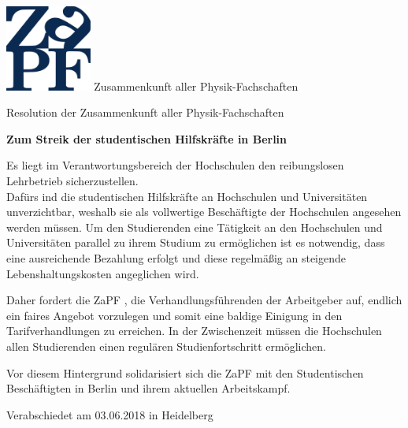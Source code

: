\documentclass[DIV=calc]{scrartcl}
\begin{document}
    \hspace{0.87\textwidth}
    \begin{minipage}{120pt}
        \vspace{-1.8cm}
        \includegraphics[width=80pt]{logo.pdf}
        \centering
        \small Zusammenkunft aller Physik-Fachschaften
    \end{minipage}
    \begin{center}
        \huge{Resolution der Zusammenkunft aller Physik-Fachschaften}\vspace{.25\baselineskip}\\
        \normalsize
    \end{center}
    \vspace{1cm} 
   \textbf{\large{Zum Streik der studentischen Hilfskräfte in Berlin}}
    

Es liegt im Verantwortungsbereich der Hochschulen den	reibungslosen
Lehrbetrieb	sicherzustellen.\\
Dafürs ind die studentischen Hilfskräfte an	Hochschulen	und
Universitäten	unverzichtbar, weshalb sie als vollwertige Beschäftigte	der	Hochschulen	angesehen
werden	müssen.	Um	den	Studierenden	eine	Tätigkeit	an	den	Hochschulen	und	Universitäten	parallel
zu	ihrem	Studium	zu	ermöglichen	ist	es	notwendig,	dass	eine	ausreichende	Bezahlung	erfolgt	und
diese	regelmäßig	an	steigende	Lebenshaltungskosten	angeglichen	wird.

Daher	fordert	die	ZaPF , die Verhandlungsführenden der Arbeitgeber auf,	endlich	ein	faires	Angebot	vorzulegen	und	somit	eine
baldige	Einigung	in	den	Tarifverhandlungen	zu	erreichen.	In	der	Zwischenzeit	müssen	die
Hochschulen	allen	Studierenden	einen	regulären	Studienfortschritt	ermöglichen.

Vor	diesem	Hintergrund	solidarisiert	sich	die	ZaPF	mit	den	Studentischen	Beschäftigten	in	Berlin
und	ihrem	aktuellen	Arbeitskampf.


    \begin{flushright}
        Verabschiedet am 03.06.2018 in Heidelberg
    \end{flushright}
    
    
\end{document}
